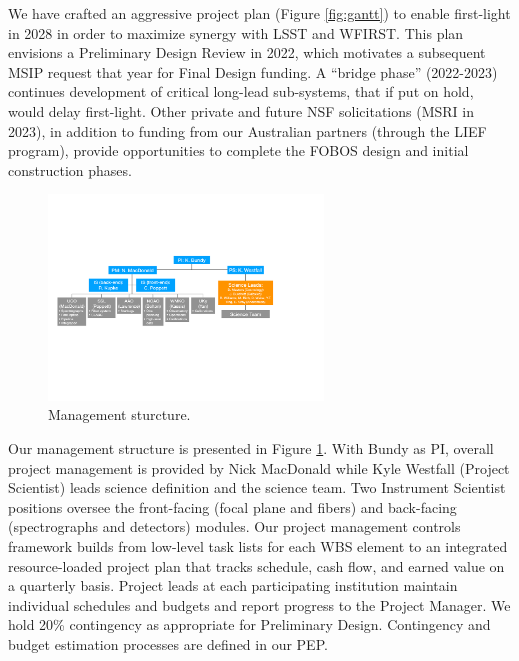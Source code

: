 \documentclass[oneside,11pt]{amsart}
\begin{document}
We have crafted an aggressive project plan (Figure \ref{fig:gantt}) to enable first-light in 2028 in order to maximize
synergy with LSST and WFIRST.  This plan envisions a Preliminary Design Review in 2022, which motivates a subsequent
MSIP request that year for Final Design funding.  A ``bridge phase'' (2022-2023) continues development of critical
long-lead sub-systems, that if put on hold, would delay first-light.  Other private and future NSF solicitations (MSRI
in 2023), in addition to funding from our Australian partners (through the LIEF program), provide opportunities to
complete the FOBOS design and initial construction phases.


\begin{figure}\small
%
\includegraphics[width=0.65\textwidth]{figs/org_chart_v1.pdf}
%
\caption{Management sturcture.}
%
\label{fig:org}
%
\end{figure}

Our management structure is presented in Figure \ref{fig:org}.  With Bundy as PI, overall project management is
provided by Nick MacDonald while Kyle Westfall (Project Scientist) leads science definition and the science team.  Two
Instrument Scientist positions oversee the front-facing (focal plane and fibers) and back-facing (spectrographs and
detectors) modules.  Our project management controls framework builds from low-level task lists for each WBS element to
an integrated resource-loaded project plan that tracks schedule, cash flow, and earned value on a quarterly basis.
Project leads at each participating institution maintain individual schedules and budgets and report progress to the
Project Manager.  We hold 20\% contingency as appropriate for Preliminary Design. Contingency and budget estimation
processes are defined in our PEP.
\end{document}
